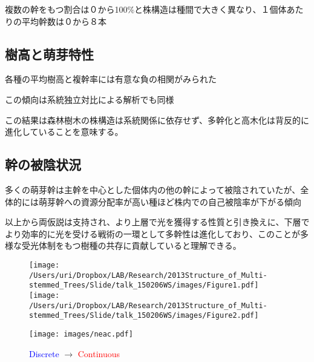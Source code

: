 \documentclass[a0, 36pt, plainboxedsections]{sciposter} %
\begin{document}
複数の幹をもつ割合は０から100\%と株構造は種間で大きく異なり、１個体あたりの平均幹数は０から８本

\subsection*{樹高と萌芽特性}

\begin{list}{}{\setlength{\itemindent}{1em}}
  \item 各種の平均樹高と複幹率には有意な負の相関がみられた
  \item この傾向は系統独立対比による解析でも同様
\end{list}

この結果は森林樹木の株構造は系統関係に依存せず、多幹化と高木化は背反的に進化していることを意味する。


\subsection*{幹の被陰状況}

多くの萌芽幹は主幹を中心とした個体内の他の幹によって被陰されていたが、全体的には萌芽幹への資源分配率が高い種ほど株内での自己被陰率が下がる傾向

以上から両仮説は支持され、より上層で光を獲得する性質と引き換えに、下層でより効率的に光を受ける戦術の一環として多幹性は進化しており、このことが多様な受光体制をもつ樹種の共存に貢献していると理解できる。

\begin{figure}
	\begin{center}
		\texttt{[image: /Users/uri/Dropbox/LAB/Research/2013Structure\_of\_Multi-stemmed\_Trees/Slide/talk\_150206WS/images/Figure1.pdf]}
		\texttt{[image: /Users/uri/Dropbox/LAB/Research/2013Structure\_of\_Multi-stemmed\_Trees/Slide/talk\_150206WS/images/Figure2.pdf]}
	\end{center}
\end{figure}

\begin{figure}[H]
  \begin{center}
	\texttt{[image: images/neac.pdf]}
	{\small\caption{{\textcolor{blue}{Discrete}} $\rightarrow$ {\textcolor{red}{Continuous}}}}
  \end{center}
\end{figure}

\begin{mdframed}[style=section.frame]
  \centering\huge{}
\end{mdframed}
\end{document}
